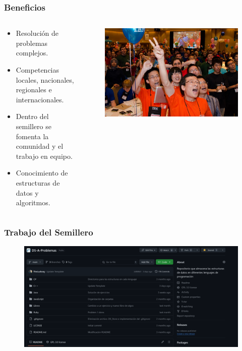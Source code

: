 \documentclass[17pt, t, lualatex]{beamer}
\begin{document}
\begin{frame}
  \frametitle{Beneficios}

  \begin{columns}
    \begin{column}{.5\textwidth}
      \begin{itemize}
        \item Resolución de problemas complejos.
        \item Competencias locales, nacionales, regionales e internacionales.
        \item Dentro del semillero se fomenta la comunidad y el trabajo en equipo.
        \item Conocimiento de estructuras de datos y algoritmos.
      \end{itemize}
    \end{column}

    \begin{column}{.5\textwidth}
      \begin{figure}
        \centering
        \includegraphics[width=\textwidth]{img/ICPC.jpg}
      \end{figure}
    \end{column}
  \end{columns}
\end{frame}

\begin{frame}
  \frametitle{Trabajo del Semillero}
  \begin{figure}
    \centering
    \includegraphics[height=0.95\textheight]{img/GitHub.png}
  \end{figure}
\end{frame}
\end{document}
